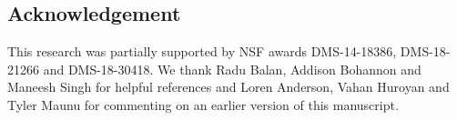 \documentclass{article}
\begin{document}
\subsection*{Acknowledgement}
This research was partially supported by NSF {awards DMS-14-18386, DMS-18-21266 and DMS-18-30418}. We thank Radu Balan, Addison Bohannon and Maneesh Singh for helpful references and Loren Anderson, Vahan Huroyan and Tyler Maunu for commenting on an earlier version of this manuscript.



\end{document}
